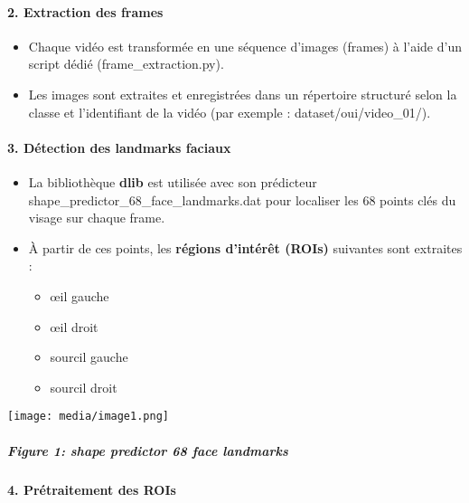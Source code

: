 \documentclass[
]{article}
\begin{document}
\hypertarget{extraction-des-frames}{%
\paragraph{\texorpdfstring{\textbf{2. Extraction des frames}}{2. Extraction des frames}}\label{extraction-des-frames}}

\begin{itemize}
\item
  Chaque vidéo est transformée en une séquence d'images (frames) à l'aide d'un script dédié (frame\_extraction.py).
\item
  Les images sont extraites et enregistrées dans un répertoire structuré selon la classe et l'identifiant de la vidéo (par exemple : dataset/oui/video\_01/).
\end{itemize}

\hypertarget{duxe9tection-des-landmarks-faciaux}{%
\paragraph{\texorpdfstring{\textbf{3. Détection des landmarks faciaux}}{3. Détection des landmarks faciaux}}\label{duxe9tection-des-landmarks-faciaux}}

\begin{itemize}
\item
  La bibliothèque \textbf{dlib} est utilisée avec son prédicteur shape\_predictor\_68\_face\_landmarks.dat pour localiser les 68 points clés du visage sur chaque frame.
\item
  À partir de ces points, les \textbf{régions d'intérêt (ROIs)} suivantes sont extraites :

  \begin{itemize}
  \item
    œil gauche
  \item
    œil droit
  \item
    sourcil gauche
  \item
    sourcil droit
  \end{itemize}
\end{itemize}

\texttt{[image: media/image1.png]}

\hypertarget{figure-1-shape-predictor-68-face-landmarks}{%
\subparagraph{Figure 1: shape predictor 68 face landmarks}\label{figure-1-shape-predictor-68-face-landmarks}}

\hypertarget{pruxe9traitement-des-rois}{%
\paragraph{\texorpdfstring{\textbf{4. Prétraitement des ROIs}}{4. Prétraitement des ROIs}}\label{pruxe9traitement-des-rois}}
\end{document}
